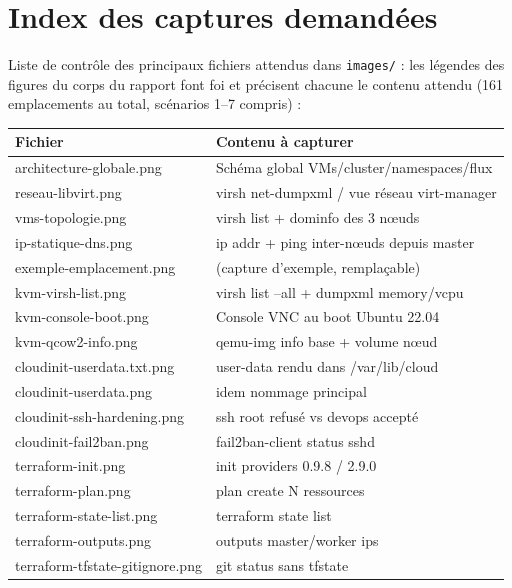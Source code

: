 \documentclass[12pt,a4paper,twoside,openright]{report}
\begin{document}
\chapter{Index des captures demandées}\label{app:captures}

Liste de contrôle des principaux fichiers attendus dans \texttt{images/} : les légendes des figures du corps du rapport font foi et précisent chacune le contenu attendu (161 emplacements au total, scénarios 1--7 compris) :

{\footnotesize
\begin{center}\label{tab:an-index-des-captures-demandees}\end{center}
\begin{longtable}{@{}p{5.6cm}p{9.4cm}@{}}
\toprule
\textbf{Fichier} & \textbf{Contenu à capturer} \\
\midrule
\endhead
architecture-globale.png & Schéma global VMs/cluster/namespaces/flux \\
reseau-libvirt.png & virsh net-dumpxml / vue réseau virt-manager \\
vms-topologie.png & virsh list + dominfo des 3 nœuds \\
ip-statique-dns.png & ip addr + ping inter-nœuds depuis master \\
exemple-emplacement.png & (capture d'exemple, remplaçable) \\
kvm-virsh-list.png & virsh list --all + dumpxml memory/vcpu \\
kvm-console-boot.png & Console VNC au boot Ubuntu 22.04 \\
kvm-qcow2-info.png & qemu-img info base + volume nœud \\
cloudinit-userdata.txt.png & user-data rendu dans /var/lib/cloud \\
cloudinit-userdata.png & idem nommage principal \\
cloudinit-ssh-hardening.png & ssh root refusé vs devops accepté \\
cloudinit-fail2ban.png & fail2ban-client status sshd \\
terraform-init.png & init providers 0.9.8 / 2.9.0 \\
terraform-plan.png & plan create N ressources \\
terraform-state-list.png & terraform state list \\
terraform-outputs.png & outputs master/worker ips \\
terraform-tfstate-gitignore.png & git status sans tfstate \\

\end{longtable}}
\end{document}
